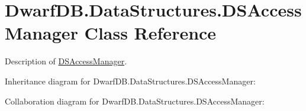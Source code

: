 \hypertarget{class_dwarf_d_b_1_1_data_structures_1_1_d_s_access_manager}{\section{Dwarf\+D\+B.\+Data\+Structures.\+D\+S\+Access\+Manager Class Reference}
\label{class_dwarf_d_b_1_1_data_structures_1_1_d_s_access_manager}
}


Description of \hyperlink{class_dwarf_d_b_1_1_data_structures_1_1_d_s_access_manager}{D\+S\+Access\+Manager}.  




Inheritance diagram for Dwarf\+D\+B.\+Data\+Structures.\+D\+S\+Access\+Manager\+:


Collaboration diagram for Dwarf\+D\+B.\+Data\+Structures.\+D\+S\+Access\+Manager\+:
